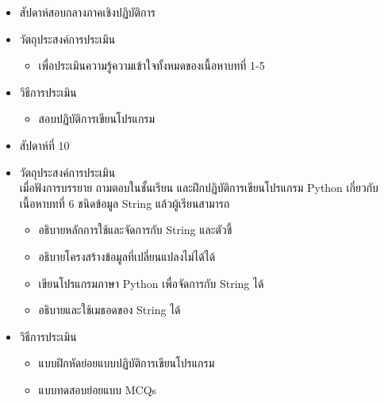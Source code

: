 \begin{tcolorbox}[breakable,enhanced,fonttitle=\bfseries]
\begin{itemize}
\item สัปดาห์สอบกลางภาคเชิงปฏิบัติการ
\item วัตถุประสงค์การประเมิน
	\begin{itemize}
	\item เพื่อประเมินความรู้ความเข้าใจทั้งหมดของเนื้อหาบทที่ 1-5
	\end{itemize}
\item วิธีการประเมิน
	\begin{itemize}
	\item สอบปฏิบัติการเขียนโปรแกรม
	\end{itemize}
\end{itemize}
\end{tcolorbox}
\vspace{1.5cm}

\begin{tcolorbox}[breakable,enhanced,fonttitle=\bfseries]
\begin{itemize}
\item สัปดาห์ที่ 10
\item วัตถุประสงค์การประเมิน
	\\ เมื่อฟังการบรรยาย ถามตอบในชั้นเรียน และฝึกปฏิบัติการเขียนโปรแกรม Python เกี่ยวกับเนื้อหาบทที่ 6 ชนิดข้อมูล String แล้วผู้เรียนสามารถ
	\begin{itemize}
	\item อธิบายหลักการใช้และจัดการกับ String และตัวชี้
	\item อธิบายโครงสร้างข้อมูลที่เปลี่ยนแปลงไม่ได้ได้
	\item เขียนโปรแกรมภาษา Python เพื่อจัดการกับ String ได้
	\item อธิบายและใช้เมธอดของ String ได้
	\end{itemize}
\item วิธีการประเมิน
	\begin{itemize}
	\item แบบฝึกหัดย่อยแบบปฏิบัติการเขียนโปรแกรม
	\item แบบทดสอบย่อยแบบ MCQs
	\end{itemize}
\end{itemize}
\end{tcolorbox}
\vspace{1.5cm}

